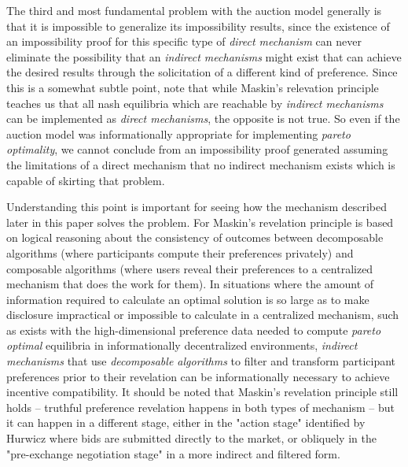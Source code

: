 The third and most fundamental problem with the auction model generally is that it is impossible to generalize its impossibility results, since the existence of an impossibility proof for this specific type of \textit{direct mechanism} can never eliminate the possibility that an \textit{indirect mechanisms} might exist that can achieve the desired results through the solicitation of a different kind of preference. Since this is a somewhat subtle point, note that while Maskin's relevation principle teaches us that all nash equilibria which are reachable by \textit{indirect mechanisms} can be implemented as \textit{direct mechanisms}, the opposite is not true. So even if the auction model was informationally appropriate for implementing \textit{pareto optimality}, we cannot conclude from an impossibility proof generated assuming the limitations of a direct mechanism that no indirect mechanism exists which is capable of skirting that problem.

Understanding this point is important for seeing how the mechanism described later in this paper solves the problem. For Maskin's revelation principle is based on logical reasoning about the consistency of outcomes between decomposable algorithms (where participants compute their preferences privately) and composable algorithms (where users reveal their preferences to a centralized mechanism that does the work for them). In situations where the amount of information required to calculate an optimal solution is so large as to make disclosure impractical or impossible to calculate in a centralized mechanism, such as exists with the high-dimensional preference data needed to compute \textit{pareto optimal} equilibria in informationally decentralized environments, \textit{indirect mechanisms} that use \textit{decomposable algorithms} to filter and transform participant preferences prior to their revelation can be informationally necessary to achieve incentive compatibility. It should be noted that Maskin's revelation principle still holds -- truthful preference revelation happens in both types of mechanism -- but it can happen in a different stage, either in the "action stage" identified by Hurwicz where bids are submitted directly to the market, or obliquely in the "pre-exchange negotiation stage" in a more indirect and filtered form.

